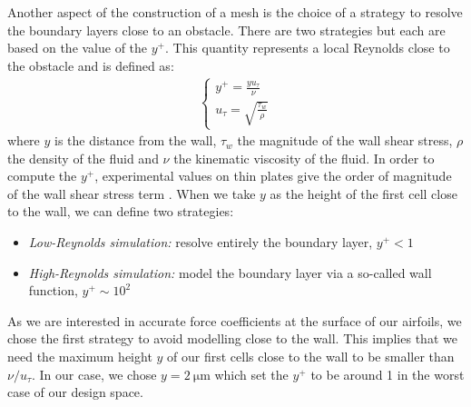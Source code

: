 \begin{subappendices}
	Another aspect of the construction of a mesh is the choice of a strategy to resolve the boundary layers close to an obstacle. There are two strategies but each are based on the value of the $y^+$. This quantity represents a local Reynolds close to the obstacle and is defined as:
	\begin{align}
		\begin{cases}
			y^+ = \frac{yu_\tau}{\nu} \\
			u_\tau = \sqrt{\frac{\tau_w}{\rho}}
		\end{cases}
	\end{align}
	where $y$ is the distance from the wall, $\tau_w$ the magnitude of the wall shear stress, $\rho$ the density of the fluid and $\nu$ the kinematic viscosity of the fluid. In order to compute the $y^+$, experimental values on thin plates give the order of magnitude of the wall shear stress term \cite{boundary}. When we take $y$ as the height of the first cell close to the wall, we can define two strategies:
	\begin{itemize}
		\item \emph{Low-Reynolds simulation:} resolve entirely the boundary layer, $y^+ < 1$
		\item \emph{High-Reynolds simulation:} model the boundary layer via a so-called wall function, $y^+ \sim 10^2$
	\end{itemize}
	As we are interested in accurate force coefficients at the surface of our airfoils, we chose the first strategy to avoid modelling close to the wall. This implies that we need the maximum height $y$ of our first cells close to the wall to be smaller than $\nu/u_\tau$. In our case, we chose $y = \SI{2}{\micro\meter}$ which set the $y^+$ to be around 1 in the worst case of our design space.
	

\end{subappendices}

